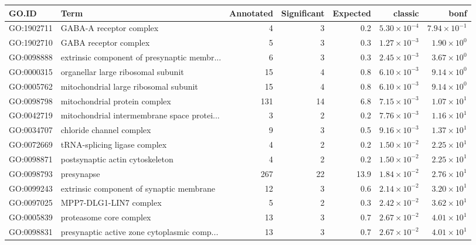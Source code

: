 \begin{table}[ht]
\centering
\begin{adjustbox}{max width=\textwidth}
\begin{tabular}{llrrrrr}
  \hline
GO.ID & Term & Annotated & Significant & Expected & classic & bonf \\ 
  \hline
GO:1902711 & GABA-A receptor complex & 4 & 3 & 0.2 & $5.30 \times 10^{-4}$ & $7.94 \times 10^{-1}$ \\ 
  GO:1902710 & GABA receptor complex & 5 & 3 & 0.3 & $1.27 \times 10^{-3}$ & $1.90 \times 10^{0}$ \\ 
  GO:0098888 & extrinsic component of presynaptic membr... & 6 & 3 & 0.3 & $2.45 \times 10^{-3}$ & $3.67 \times 10^{0}$ \\ 
  GO:0000315 & organellar large ribosomal subunit & 15 & 4 & 0.8 & $6.10 \times 10^{-3}$ & $9.14 \times 10^{0}$ \\ 
  GO:0005762 & mitochondrial large ribosomal subunit & 15 & 4 & 0.8 & $6.10 \times 10^{-3}$ & $9.14 \times 10^{0}$ \\ 
  GO:0098798 & mitochondrial protein complex & 131 & 14 & 6.8 & $7.15 \times 10^{-3}$ & $1.07 \times 10^{1}$ \\ 
  GO:0042719 & mitochondrial intermembrane space protei... & 3 & 2 & 0.2 & $7.76 \times 10^{-3}$ & $1.16 \times 10^{1}$ \\ 
  GO:0034707 & chloride channel complex & 9 & 3 & 0.5 & $9.16 \times 10^{-3}$ & $1.37 \times 10^{1}$ \\ 
  GO:0072669 & tRNA-splicing ligase complex & 4 & 2 & 0.2 & $1.50 \times 10^{-2}$ & $2.25 \times 10^{1}$ \\ 
  GO:0098871 & postsynaptic actin cytoskeleton & 4 & 2 & 0.2 & $1.50 \times 10^{-2}$ & $2.25 \times 10^{1}$ \\ 
  GO:0098793 & presynapse & 267 & 22 & 13.9 & $1.84 \times 10^{-2}$ & $2.76 \times 10^{1}$ \\ 
  GO:0099243 & extrinsic component of synaptic membrane & 12 & 3 & 0.6 & $2.14 \times 10^{-2}$ & $3.20 \times 10^{1}$ \\ 
  GO:0097025 & MPP7-DLG1-LIN7 complex & 5 & 2 & 0.3 & $2.42 \times 10^{-2}$ & $3.62 \times 10^{1}$ \\ 
  GO:0005839 & proteasome core complex & 13 & 3 & 0.7 & $2.67 \times 10^{-2}$ & $4.01 \times 10^{1}$ \\ 
  GO:0098831 & presynaptic active zone cytoplasmic comp... & 13 & 3 & 0.7 & $2.67 \times 10^{-2}$ & $4.01 \times 10^{1}$ \\ 

\end{tabular}
\end{adjustbox}
\end{table}
